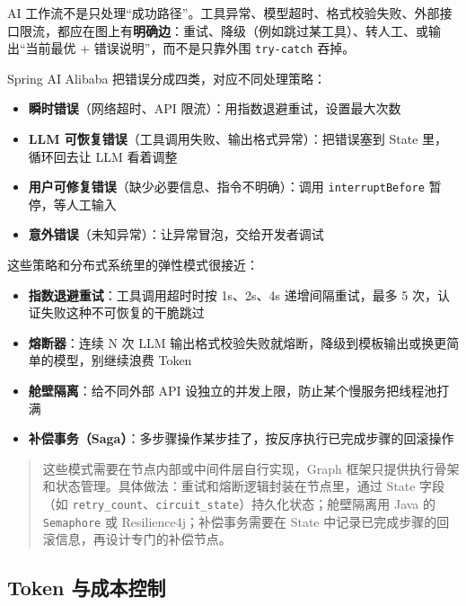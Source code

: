 \documentclass[9pt,a4paper,twocolumn]{ctexart}
\begin{document}
AI 工作流不是只处理“成功路径”。工具异常、模型超时、格式校验失败、外部接口限流，都应在图上有\textbf{明确边}：重试、降级（例如跳过某工具）、转人工、或输出“当前最优 + 错误说明”，而不是只靠外围 \texttt{try-catch} 吞掉。



Spring AI Alibaba 把错误分成四类，对应不同处理策略：


\begin{itemize}[itemsep=1pt, topsep=2pt]
  \item \textbf{瞬时错误}（网络超时、API 限流）：用指数退避重试，设置最大次数
  \item \textbf{LLM 可恢复错误}（工具调用失败、输出格式异常）：把错误塞到 State 里，循环回去让 LLM 看着调整
  \item \textbf{用户可修复错误}（缺少必要信息、指令不明确）：调用 \texttt{interruptBefore} 暂停，等人工输入
  \item \textbf{意外错误}（未知异常）：让异常冒泡，交给开发者调试
\end{itemize}


这些策略和分布式系统里的弹性模式很接近：


\begin{itemize}[itemsep=1pt, topsep=2pt]
  \item \textbf{指数退避重试}：工具调用超时时按 1s、2s、4s 递增间隔重试，最多 5 次，认证失败这种不可恢复的干脆跳过
  \item \textbf{熔断器}：连续 N 次 LLM 输出格式校验失败就熔断，降级到模板输出或换更简单的模型，别继续浪费 Token
  \item \textbf{舱壁隔离}：给不同外部 API 设独立的并发上限，防止某个慢服务把线程池打满
  \item \textbf{补偿事务（Saga）}：多步骤操作某步挂了，按反序执行已完成步骤的回滚操作
\end{itemize}


\begin{quote}
这些模式需要在节点内部或中间件层自行实现，Graph 框架只提供执行骨架和状态管理。具体做法：重试和熔断逻辑封装在节点里，通过 State 字段（如 \texttt{retry\_count}、\texttt{circuit\_state}）持久化状态；舱壁隔离用 Java 的 \texttt{Semaphore} 或 Resilience4j；补偿事务需要在 State 中记录已完成步骤的回滚信息，再设计专门的补偿节点。
\end{quote}



\subsection*{Token 与成本控制}
\end{document}
